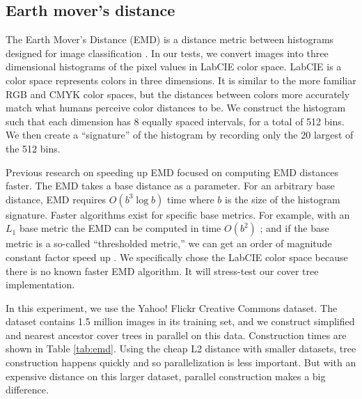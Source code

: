 \documentclass[../main.tex]{subfiles}
\begin{document}
\subsection{Earth mover's distance}

The Earth Mover's Distance (EMD) is a distance metric between histograms designed for image classification \cite{Rubner1998}.
In our tests, we convert images into three dimensional histograms of the pixel values in LabCIE color space.
LabCIE is a color space represents colors in three dimensions.
It is similar to the more familiar RGB and CMYK color spaces,
but the distances between colors more accurately match what humans perceive color distances to be.
We construct the histogram such that each dimension has 8 equally spaced intervals, for a total of 512 bins.
We then create a ``signature'' of the histogram by recording only the 20 largest of the 512 bins.

Previous research on speeding up EMD focused on computing EMD distances faster.
The EMD takes a base distance as a parameter.
For an arbitrary base distance, EMD requires $O(b^3\log b)$ time where $b$ is the size of the histogram signature.
Faster algorithms exist for specific base metrics.
For example, with an $L_1$ base metric the EMD can be computed in time $O(b^2)$ \cite{Ling07}; and if the base metric is a so-called ``thresholded metric,'' we can get an order of magnitude constant factor speed up \cite{Pele2009}.
We specifically chose the LabCIE color space because there is no known faster EMD algorithm.
It will stress-test our cover tree implementation.

In this experiment, we use the Yahoo! Flickr Creative Commons dataset.
The dataset contains 1.5 million images in its training set,
and we construct simplified and nearest ancestor cover trees in parallel on this data.
Construction times are shown in Table \ref{tab:emd}.
Using the cheap L2 distance with smaller datasets, tree construction happens quickly and so parallelization is less important.
But with an expensive distance on this larger dataset, parallel construction makes a big difference.
\end{document}
